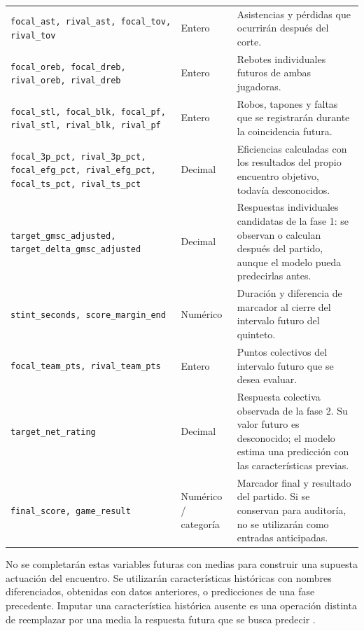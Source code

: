 \begin{longtable}{@{}>{\raggedright\arraybackslash}p{5.0cm}>{\raggedright\arraybackslash}p{1.9cm}>{\raggedright\arraybackslash}p{7.7cm}@{}}
\texttt{focal\_\allowbreak ast, rival\_\allowbreak ast, focal\_\allowbreak tov, rival\_\allowbreak tov} & Entero & Asistencias y pérdidas que ocurrirán después del corte.\\
\texttt{focal\_\allowbreak oreb, focal\_\allowbreak dreb, rival\_\allowbreak oreb, rival\_\allowbreak dreb} & Entero & Rebotes individuales futuros de ambas jugadoras.\\
\texttt{focal\_\allowbreak stl, focal\_\allowbreak blk, focal\_\allowbreak pf, rival\_\allowbreak stl, rival\_\allowbreak blk, rival\_\allowbreak pf} & Entero & Robos, tapones y faltas que se registrarán durante la coincidencia futura.\\
\texttt{focal\_\allowbreak 3p\_\allowbreak pct, rival\_\allowbreak 3p\_\allowbreak pct, focal\_\allowbreak efg\_\allowbreak pct, rival\_\allowbreak efg\_\allowbreak pct, focal\_\allowbreak ts\_\allowbreak pct, rival\_\allowbreak ts\_\allowbreak pct} & Decimal & Eficiencias calculadas con los resultados del propio encuentro objetivo, todavía desconocidos.\\
\texttt{target\_\allowbreak gmsc\_\allowbreak adjusted, target\_\allowbreak delta\_\allowbreak gmsc\_\allowbreak adjusted} & Decimal & Respuestas individuales candidatas de la fase 1: se observan o calculan después del partido, aunque el modelo pueda predecirlas antes.\\
\texttt{stint\_\allowbreak seconds, score\_\allowbreak margin\_\allowbreak end} & Numérico & Duración y diferencia de marcador al cierre del intervalo futuro del quinteto.\\
\texttt{focal\_\allowbreak team\_\allowbreak pts, rival\_\allowbreak team\_\allowbreak pts} & Entero & Puntos colectivos del intervalo futuro que se desea evaluar.\\
\texttt{target\_\allowbreak net\_\allowbreak rating} & Decimal & Respuesta colectiva observada de la fase 2. Su valor futuro es desconocido; el modelo estima una predicción con las características previas.\\
\texttt{final\_\allowbreak score, game\_\allowbreak result} & Numérico / categoría & Marcador final y resultado del partido. Si se conservan para auditoría, no se utilizarán como entradas anticipadas.\\
\end{longtable}
\endgroup
No se completarán estas variables futuras con medias para construir una supuesta actuación del encuentro. Se utilizarán características históricas con nombres diferenciados, obtenidas con datos anteriores, o predicciones de una fase precedente. Imputar una característica histórica ausente es una operación distinta de reemplazar por una media la respuesta futura que se busca predecir \cite{sklearnCommonPitfallsPonderacion}.

